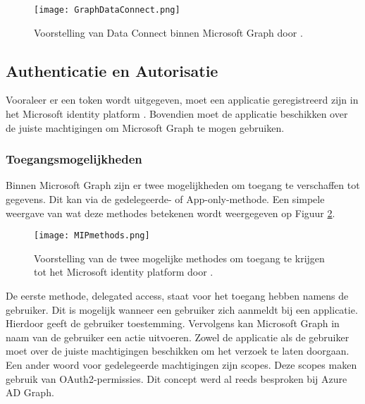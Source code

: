 \begin{figure}[!h]
    \texttt{[image: GraphDataConnect.png]}
    \caption[Voorbeeld Microsoft Graph Data Connect]{Voorstelling van Data Connect binnen Microsoft Graph door \textcite{Microsoft2022c}.}
    \label{MSGDC}
\end{figure}

\subsection{Authenticatie en Autorisatie}

Vooraleer er een token wordt uitgegeven, moet een applicatie geregistreerd zijn in het Microsoft identity platform \autocite{Microsoft2022b}. Bovendien moet de applicatie beschikken over de juiste machtigingen om Microsoft Graph te mogen gebruiken. \\

\subsubsection{Toegangsmogelijkheden}

Binnen Microsoft Graph zijn er twee mogelijkheden om toegang te verschaffen tot gegevens. Dit kan via de gedelegeerde- of App-only-methode. Een simpele weergave van wat deze methodes betekenen wordt weergegeven op Figuur \ref{MIPM}. \\

\begin{figure}[h]
    \texttt{[image: MIPmethods.png]}
    \caption[Voorbeeld toegangsmogelijkheden]{Voorstelling van de twee mogelijke methodes om toegang te krijgen tot het Microsoft identity platform door \autocite{Microsoft2022b}.}
    \label{MIPM}
\end{figure}

De eerste methode, delegated access, staat voor het toegang hebben namens de gebruiker. Dit is mogelijk wanneer een gebruiker zich aanmeldt bij een applicatie. Hierdoor geeft de gebruiker toestemming. Vervolgens kan Microsoft Graph in naam van de gebruiker een actie uitvoeren. Zowel de applicatie als de gebruiker moet over de juiste machtigingen beschikken om het verzoek te laten doorgaan. \\

Een ander woord voor gedelegeerde machtigingen zijn scopes. Deze scopes maken gebruik van OAuth2-permissies. Dit concept werd al reeds besproken bij Azure \ac{AD} Graph. \\

